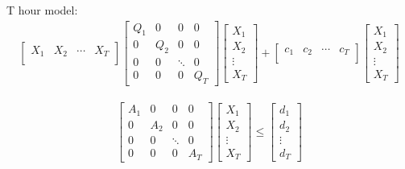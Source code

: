 \documentclass[11pt]{article} %
\begin{document}
T hour model:
\begin{align} 
    \begin{bmatrix}
        X_1 & X_2 & \cdots  & X_T\\
    \end{bmatrix} 
    \begin{bmatrix}
        Q_1 & 0 & 0 & 0\\
        0 & Q_2 & 0 & 0\\
        0 & 0 & \ddots  & 0\\
        0 & 0 & 0 & Q_T
    \end{bmatrix} 
    \begin{bmatrix}
        X_1\\
        X_2\\
        \vdots \\
        X_T
    \end{bmatrix} +
    \begin{bmatrix}
        c_1 & c_2 & \cdots  & c_T\\
    \end{bmatrix}
    \begin{bmatrix}
        X_1\\
        X_2\\
        \vdots \\
        X_T
    \end{bmatrix}
\end{align}

\begin{align} 
    \begin{bmatrix}
        A_1 & 0 & 0 & 0\\
        0 & A_2 & 0 & 0\\
        0 & 0 & \ddots  & 0\\
        0 & 0 & 0 & A_T
    \end{bmatrix} 
    \begin{bmatrix}
        X_1\\
        X_2\\
        \vdots \\
        X_T
    \end{bmatrix} \leq
    \begin{bmatrix}
        d_1\\
        d_2\\
        \vdots \\
        d_T
    \end{bmatrix}
\end{align}
\end{document}
